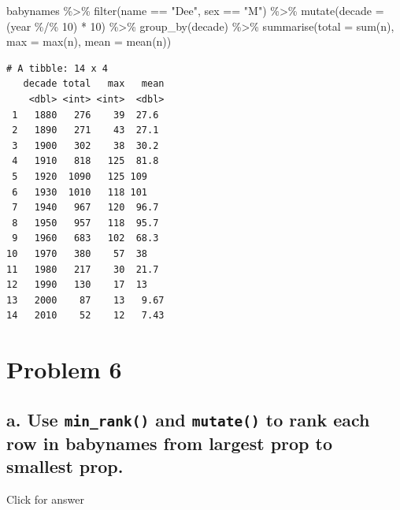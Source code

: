 \documentclass[
]{book}
\newenvironment{Shaded}{\begin{snugshade}}{\end{snugshade}}
\newcommand{\AttributeTok}[1]{\textcolor[rgb]{0.77,0.63,0.00}{#1}}
\newcommand{\DecValTok}[1]{\textcolor[rgb]{0.00,0.00,0.81}{#1}}
\newcommand{\FunctionTok}[1]{\textcolor[rgb]{0.00,0.00,0.00}{#1}}
\newcommand{\NormalTok}[1]{#1}
\newcommand{\SpecialCharTok}[1]{\textcolor[rgb]{0.00,0.00,0.00}{#1}}
\newcommand{\StringTok}[1]{\textcolor[rgb]{0.31,0.60,0.02}{#1}}
\begin{document}
\begin{Shaded}
\begin{Highlighting}[]
\NormalTok{babynames }\SpecialCharTok{\%\textgreater{}\%} 
  \FunctionTok{filter}\NormalTok{(name }\SpecialCharTok{==} \StringTok{"Dee"}\NormalTok{, sex }\SpecialCharTok{==} \StringTok{"M"}\NormalTok{) }\SpecialCharTok{\%\textgreater{}\%} 
  \FunctionTok{mutate}\NormalTok{(}\AttributeTok{decade =}\NormalTok{ (year }\SpecialCharTok{\%/\%} \DecValTok{10}\NormalTok{) }\SpecialCharTok{*} \DecValTok{10}\NormalTok{) }\SpecialCharTok{\%\textgreater{}\%} 
  \FunctionTok{group\_by}\NormalTok{(decade) }\SpecialCharTok{\%\textgreater{}\%}
  \FunctionTok{summarise}\NormalTok{(}\AttributeTok{total =} \FunctionTok{sum}\NormalTok{(n),}
            \AttributeTok{max =} \FunctionTok{max}\NormalTok{(n), }
            \AttributeTok{mean =} \FunctionTok{mean}\NormalTok{(n))}
\end{Highlighting}
\end{Shaded}

\begin{verbatim}
# A tibble: 14 x 4
   decade total   max   mean
    <dbl> <int> <int>  <dbl>
 1   1880   276    39  27.6 
 2   1890   271    43  27.1 
 3   1900   302    38  30.2 
 4   1910   818   125  81.8 
 5   1920  1090   125 109   
 6   1930  1010   118 101   
 7   1940   967   120  96.7 
 8   1950   957   118  95.7 
 9   1960   683   102  68.3 
10   1970   380    57  38   
11   1980   217    30  21.7 
12   1990   130    17  13   
13   2000    87    13   9.67
14   2010    52    12   7.43
\end{verbatim}

\hypertarget{problem-6}{%
\section{Problem 6}\label{problem-6}}

\hypertarget{a.-use-min_rank-and-mutate-to-rank-each-row-in-babynames-from-largest-prop-to-smallest-prop.}{%
\subsection{\texorpdfstring{a. Use \texttt{min\_rank()} and \texttt{mutate()} to rank each row in babynames from largest prop to smallest prop.}{a. Use min\_rank() and mutate() to rank each row in babynames from largest prop to smallest prop.}}\label{a.-use-min_rank-and-mutate-to-rank-each-row-in-babynames-from-largest-prop-to-smallest-prop.}}

Click for answer
\end{document}
